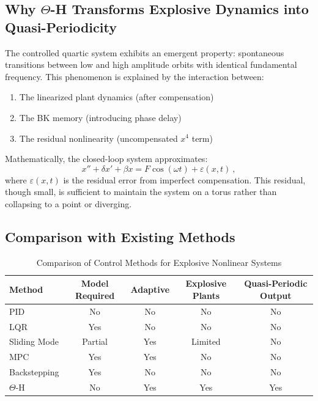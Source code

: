 \documentclass[twocolumn]{article}
\begin{document}
\subsection{Why $\Theta$-H Transforms Explosive Dynamics into Quasi-Periodicity}

The controlled quartic system exhibits an emergent property: 
spontaneous transitions between low and high amplitude orbits 
with identical fundamental frequency. This phenomenon is explained by 
the interaction between:

\begin{enumerate}
    \item The linearized plant dynamics (after compensation)
    \item The BK memory (introducing phase delay)
    \item The residual nonlinearity (uncompensated $x^4$ term)
\end{enumerate}

Mathematically, the closed-loop system approximates:
\begin{equation}
x'' + \delta x' + \beta x = F\cos(\omega t) + \varepsilon(x,t)~,
\label{eq:closed_loop}
\end{equation}
where $\varepsilon(x,t)$ is the residual error from imperfect compensation. 
This residual, though small, is sufficient to maintain the system on a 
torus rather than collapsing to a point or diverging.

\subsection{Comparison with Existing Methods}

\begin{table}[htb]
\centering
\caption{Comparison of Control Methods for Explosive Nonlinear Systems}
\label{tab:comparison_methods}
{\small
\begin{tabular}{|l|c|c|c|c|}
\hline
\textbf{Method} & \textbf{Model Required} & \textbf{Adaptive} & \textbf{Explosive Plants} & \textbf{Quasi-Periodic Output} \\
\hline
PID & No & No & No & No \\
\hline
LQR & Yes & No & No & No \\
\hline
Sliding Mode & Partial & Yes & Limited & No \\
\hline
MPC & Yes & Yes & No & No \\
\hline
Backstepping & Yes & No & No & No \\
\hline
$\Theta$-H & No & Yes & Yes & Yes \\
\hline
\end{tabular}
}
\end{table}
\end{document}
